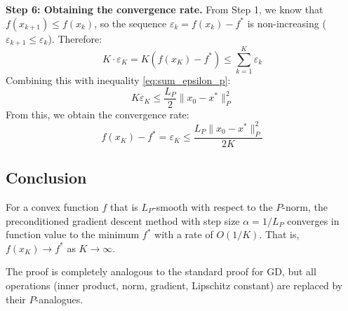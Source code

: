 \documentclass{article}
\newcommand{\normp}[1]{\|#1\|_P}       %
\begin{document}
\textbf{Step 6: Obtaining the convergence rate.}
From Step 1, we know that $f(x_{k+1}) \le f(x_k)$, so the sequence $\varepsilon_k = f(x_k) - f^*$ is non-increasing ($\varepsilon_{k+1} \le \varepsilon_k$). Therefore:
\begin{equation*}
    K \cdot \varepsilon_K = K (f(x_K) - f^*) \le \sum_{k=1}^{K} \varepsilon_k
\end{equation*}
Combining this with inequality \eqref{eq:sum_epsilon_p}:
\begin{equation*}
    K \varepsilon_K \le \frac{L_P}{2} \normp{x_0 - x^*}^2
\end{equation*}
From this, we obtain the convergence rate:
\begin{equation} \label{eq:convergence_rate_p}
    f(x_K) - f^* = \varepsilon_K \le \frac{L_P \normp{x_0 - x^*}^2}{2 K}
\end{equation}

\subsection*{Conclusion}
For a convex function $f$ that is $L_P$-smooth with respect to the $P$-norm, the preconditioned gradient descent method with step size $\alpha = 1/L_P$ converges in function value to the minimum $f^*$ with a rate of $O(1/K)$. That is, $f(x_K) \to f^*$ as $K \to \infty$.

The proof is completely analogous to the standard proof for GD, but all operations (inner product, norm, gradient, Lipschitz constant) are replaced by their $P$-analogues.
\end{document}
